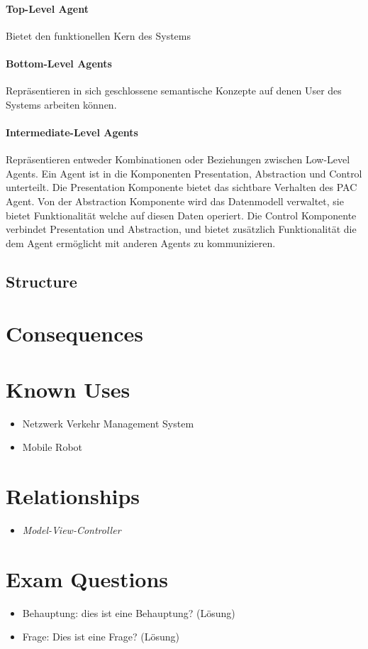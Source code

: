 \paragraph{Top-Level Agent} Bietet den funktionellen Kern des Systems
\paragraph{Bottom-Level Agents} Repräsentieren in sich geschlossene semantische Konzepte auf denen User des Systems arbeiten können. 
\paragraph{Intermediate-Level Agents} Repräsentieren entweder Kombinationen oder Beziehungen zwischen Low-Level Agents. 
Ein Agent ist in die Komponenten Presentation, Abstraction und Control unterteilt. Die Presentation Komponente bietet das sichtbare Verhalten des PAC Agent. Von der Abstraction Komponente wird das Datenmodell verwaltet, sie bietet Funktionalität welche auf diesen Daten operiert. Die Control Komponente verbindet Presentation und Abstraction, und bietet zusätzlich Funktionalität die dem Agent ermöglicht mit anderen Agents zu kommunizieren.


\subsection{Structure}

\section{Consequences}
\begin{itemize}
\end{itemize}

\section{Known Uses}
\begin{itemize}
	\item Netzwerk Verkehr Management System
	\item Mobile Robot
\end{itemize}

\section{Relationships}
\begin{itemize}
	\item \textit{Model-View-Controller} 
\end{itemize}

\section{Exam Questions}
\begin{itemize}
  \item Behauptung: dies ist eine Behauptung? (Lösung)
    \item Frage: Dies ist eine Frage? (Lösung)
\end{itemize}
